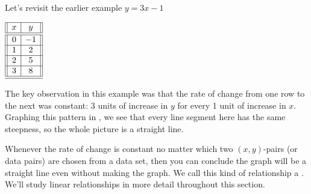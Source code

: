 \documentclass[nooutcomes]{ximera}
\begin{document}
Let's revisit the earlier example $y=3x-1$

\begin{center}
$
\begin{array}{||c|c||}
\hline
x&y\\
\hline 
\hline
0&-1\\
\hline
1&2\\
\hline
2&5\\
\hline
3&8 \\
\hline 
\hline
\end{array}
$
\end{center}


The key observation in this example was that the rate of change from one row to the next was constant: 3 units of increase in $y$ for every 1  unit of increase in $x$. Graphing this pattern in , we see that every line segment here has the same steepness, so the whole picture is a straight line.

\begin{image}
\end{image}

Whenever the rate of change is constant no matter which two $(x,y)$-pairs (or data pairs) are chosen from a data set, then you can conclude the graph will be a straight line even without making the graph. We call this kind of relationship a . We'll study linear relationships in more detail throughout this section.
\end{document}
